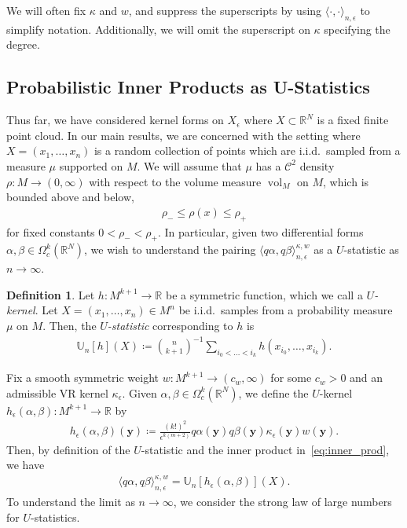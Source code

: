 \documentclass[11pt,reqno]{amsproc}
\numberwithin{equation}{section}
\newcommand{\R}{\mathbb{R}}
\newcommand{\U}{\mathbb{U}}
\newcommand{\by}{\mathbf{y}}
\newcommand{\cC}{\mathcal{C}}
\newcommand{\vol}{\operatorname{vol}}
\theoremstyle{definition}
\newtheorem{definition}[counter]{Definition}
\theoremstyle{plain}
\begin{document}
    We will often fix $\kappa$ and $w$, and suppress the superscripts by using $\langle \cdot , \cdot \rangle_{n, \epsilon}$ to simplify notation. Additionally, we will omit the superscript on $\kappa$ specifying the degree. 



    \subsection{Probabilistic Inner Products as U-Statistics} \label{ssec:probabilistic_inner_products}
    Thus far, we have considered kernel forms on $X_\epsilon$ where $X \subset \R^N$ is a fixed finite point cloud. In our main results, we are concerned with the setting where $X = (x_1, \ldots, x_n)$ is a random collection of points which are i.i.d.~sampled from a measure $\mu$ supported on $M$. We will assume that $\mu$ has a $\cC^2$ density $\rho : M \to (0, \infty)$ with respect to the volume measure $\vol_M$ on $M$, which is bounded above and below,
    \begin{align} \label{eq:density_bound}
        \rho_{-} \leq \rho(x) \leq \rho_{+}
    \end{align}
    for fixed constants $0 < \rho_- < \rho_+$. In particular, given two differential forms $\alpha, \beta \in \Omega^k_c(\R^N)$, we wish to understand the pairing $\langle q\alpha, q\beta \rangle_{n,\epsilon}^{\kappa, w}$ as a $U$-statistic as $n \to \infty$.

    \begin{definition} \label{def:u_statistic}
        Let $h: M^{k+1} \to \R$ be a symmetric function, which we call a \emph{$U$-kernel}. Let $X = (x_1, \ldots, x_n) \in M^{n}$ be i.i.d.~samples from a probability measure $\mu$ on $M$. Then, the \emph{$U$-statistic} corresponding to $h$ is
        \begin{align}
            \U_n[h](X) \coloneqq \binom{n}{k+1}^{-1} \sum_{i_0 < \ldots < i_k} h(x_{i_0}, \ldots, x_{i_k}).
        \end{align}
    \end{definition}

    Fix a smooth symmetric weight $w: M^{k+1} \to (c_w,\infty)$ for some $c_w>0$ and an admissible VR kernel $\kappa_\epsilon$. Given $\alpha, \beta \in \Omega^k_c(\R^N)$, we define the $U$-kernel $h_\epsilon(\alpha, \beta) : M^{k+1} \to \R$ by
    \begin{align} \label{eq:euclidean_u_kernel}
        h_\epsilon(\alpha, \beta)(\by) \coloneqq \frac{(k!)^2}{\epsilon^{k(m+2)}} q\alpha(\by) q\beta(\by) \kappa_\epsilon(\by) w(\by). 
    \end{align}
    Then, by definition of the $U$-statistic and the inner product in~\eqref{eq:inner_prod}, we have
    \begin{align} \label{eq:inner_product_u_statistic}
        \langle q\alpha, q\beta \rangle_{n, \epsilon}^{\kappa, w} = \U_n[h_\epsilon(\alpha,\beta)](X).
    \end{align}
    To understand the limit as $n \to \infty$, we consider the strong law of large numbers for $U$-statistics.
\end{document}
